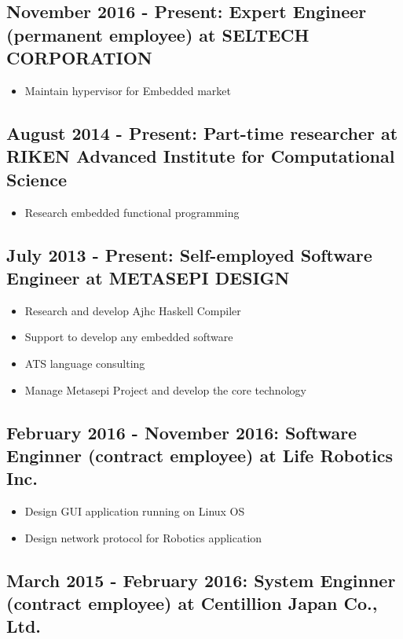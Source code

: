 \documentclass[letterpaper]{article}
\begin{document}
\subsection*{November 2016 - Present: Expert Engineer (permanent employee) at SELTECH CORPORATION}

\begin{itemize}
  \item Maintain hypervisor for Embedded market
\end{itemize}

\subsection*{August 2014 - Present: Part-time researcher at RIKEN Advanced Institute for Computational Science}

\begin{itemize}
  \item Research embedded functional programming
\end{itemize}

\subsection*{July 2013 - Present: Self-employed Software Engineer at METASEPI DESIGN}

\begin{itemize}
  \item Research and develop Ajhc Haskell Compiler
  \item Support to develop any embedded software
  \item ATS language consulting
  \item Manage Metasepi Project and develop the core technology
\end{itemize}

\subsection*{February 2016 - November 2016: Software Enginner (contract employee) at Life Robotics Inc.}

\begin{itemize}
  \item Design GUI application running on Linux OS
  \item Design network protocol for Robotics application
\end{itemize}

\subsection*{March 2015 - February 2016: System Enginner (contract employee) at Centillion Japan Co., Ltd.}
\end{document}
